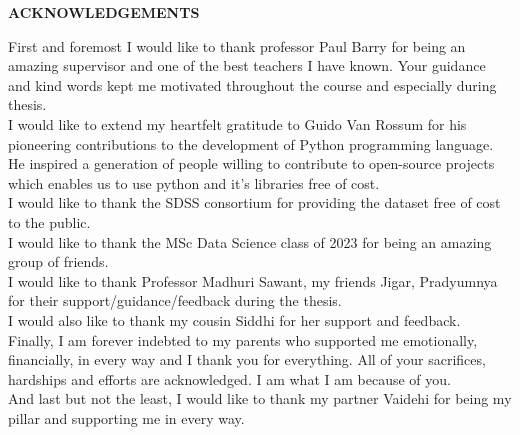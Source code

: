 \thispagestyle{empty}
\begin{titlepage}
\begin{center}
    \textbf{ACKNOWLEDGEMENTS}\\
\end{center}
    First and foremost I would like to thank professor Paul Barry for being an amazing supervisor and one of the best teachers I have known. Your guidance and kind words kept me motivated throughout the course and especially during thesis. \\
    I would like to extend my heartfelt gratitude to Guido Van Rossum for his pioneering contributions to the development of Python programming language. He inspired a generation of people willing to contribute to open-source projects which enables us to use python and it's libraries free of cost.\\
    I would like to thank the SDSS consortium for providing the dataset free of cost to the public.\\
    I would like to thank the MSc Data Science class of 2023 for being an amazing group of friends.\\
    I would like to thank Professor Madhuri Sawant, my friends Jigar, Pradyumnya for their support/guidance/feedback during the thesis. \\
    I would also like to thank my cousin Siddhi for her support and feedback.\\
    Finally, I am forever indebted to my parents who supported me emotionally, financially, in every way and I thank you for everything. All of your sacrifices, hardships and efforts are acknowledged. I am what I am because of you.\\
    And last but not the least, I would like to thank my partner Vaidehi for being my pillar and supporting me in every way.
\end{titlepage}